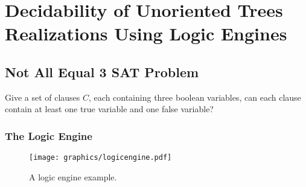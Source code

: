 \chapter{Decidability of Unoriented Trees Realizations Using Logic Engines}
\section{Not All Equal 3 SAT Problem}
\begin{prob}\label{prob:Satisfiability-2}%
Give a set of clauses $C$, each containing three boolean variables, can each clause contain at
least one true variable and one false variable?
\end{prob}
\subsection{The Logic Engine}
\begin{figure}[!htbp]
\begin{center}
\texttt{[image: graphics/logicengine.pdf]}
\caption{A logic engine example.}\label{fig:logicengine-1}
\end{center}
\end{figure}
